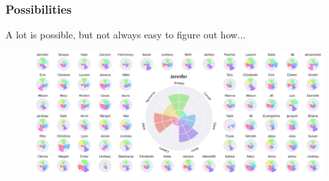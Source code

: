 \begin{frame}\frametitle{Possibilities}

A lot is possible, but not always easy to figure out how...

\begin{figure}[h]
\centering
\includegraphics[width=.9\textwidth]{img/sf_vectors.png}
\end{figure}

\end{frame}


